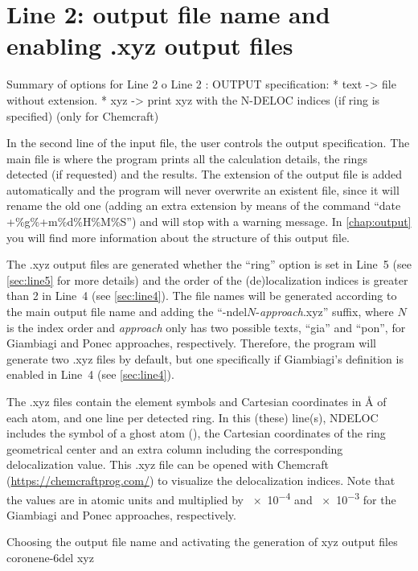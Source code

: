 \documentclass[a4paper,11pt,openany]{memoir}
\newcommand\programa{\textsc{NDELOC}}
\begin{document}
\section{Line 2: output file name and enabling .xyz output files}\label{sec:line2}
\begin{recuadro}{Summary of options for Line 2}
o Line 2 :  OUTPUT          specification:
 *  text   -> file without extension.
 *  xyz    -> print xyz with the N-DELOC indices (if ring is specified)
                        (only for Chemcraft)
\end{recuadro}
In the second line of the input file, the user controls the output specification. The main file is where the program prints all the calculation details, the rings detected (if requested) and the results. The extension of the output file is added automatically and the program will never overwrite an existent file, since it will rename the old one (adding an extra extension by means of the command ``date +\%g\%+m\%d\%H\%M\%S'') and will stop with a warning message. In \autoref{chap:output} you will find more information about the structure of this output file.

The .xyz output files are generated whether the ``ring'' option is set in Line~5 (see \autoref{sec:line5} for more details) and the order of the (de)localization indices is greater than \num{2} in Line~4 (see \autoref{sec:line4}). The file names will be generated according to the main output file name and adding the ``-ndel$N$-\emph{approach}.xyz'' suffix, where $N$ is the index order and \emph{approach} only has two possible texts, ``gia'' and ``pon'', for Giambiagi and Ponec approaches, respectively. Therefore, the program will generate two .xyz files by default, but one specifically if Giambiagi's definition is enabled in Line~4 (see \autoref{sec:line4}).

The .xyz files contain the element symbols and Cartesian coordinates in \si{\angstrom} of each atom, and one line per detected ring. In this (these) line(s), \programa~ includes the symbol of a ghost atom (), the Cartesian coordinates of the ring geometrical center and an extra column including the corresponding delocalization value. This .xyz file can be opened with Chemcraft (\url{https://chemcraftprog.com/}) to visualize the delocalization indices. Note that the values are in atomic units and multiplied by \num{e-4} and \num{e-3} for the Giambiagi and Ponec approaches, respectively.
\begin{myexample}{Choosing the output file name and activating the generation of xyz output files}
	coronene-6del xyz
\end{myexample}
\end{document}
